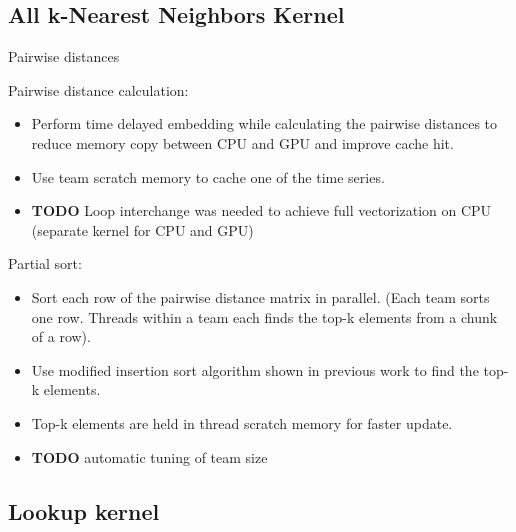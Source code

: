 \documentclass[conference]{IEEEtran}
\begin{document}
\subsection{All k-Nearest Neighbors Kernel}

\begin{algorithm}
    \SetAlgoLined
    \DontPrintSemicolon
    \caption{Pairwise distances}
    \label{pseudo:knn_cpu}
\end{algorithm}

Pairwise distance calculation:
\begin{itemize}
\item Perform time delayed embedding while calculating the pairwise distances
    to reduce memory copy between CPU and GPU and improve cache hit.
\item Use team scratch memory to cache one of the time series.
\item \textbf{TODO} Loop interchange was needed to achieve full vectorization
    on CPU (separate kernel for CPU and GPU)
\end{itemize}

Partial sort:
\begin{itemize}
\item Sort each row of the pairwise distance matrix in parallel. (Each team sorts one row. Threads within a team each finds the top-k elements from a chunk of a row).
\item Use modified insertion sort algorithm shown in previous work to find the top-k elements.
\item Top-k elements are held in thread scratch memory for faster update.
\item \textbf{TODO} automatic tuning of team size
\end{itemize}

\subsection{Lookup kernel}
\end{document}
